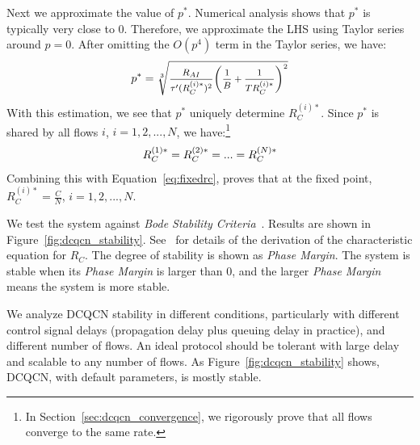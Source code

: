 Next we approximate the value of $p^*$. Numerical analysis shows that $p^*$ is 
typically very close to 0. Therefore, we approximate the LHS using Taylor series around $p=0$.
After omitting the $O(p^4)$ term in the Taylor series, we have:
\begin{equation}
\small
{p^*} = \sqrt[3]{{\frac{{{R_{AI}}}}{{{\tau '}(R_C^{(i)*})^2}}{{\left( {\frac{1}{B} + \frac{1}{TR_C^{(i)*}}} \right)}^2}}}
\label{eq:fixedp}
\end{equation}
With this estimation, we see that $p^*$ uniquely determine $R_C^{(i)*}$. 
Since $p^*$ is shared by all flows $i$, $i = 1, 2, ..., N$, we have:\footnote{In 
Section~\ref{sec:dcqcn_convergence}, we rigorously prove that all flows
converge to the same rate.}
\begin{equation}
\small
R_C^{(1)*} = R_C^{(2)*} = ... = R_C^{(N)*}
\end{equation}
Combining this with Equation~\ref{eq:fixedrc}, proves that at the fixed point, $R_C^{(i)*} = \frac{C}{N}$, 
$i = 1, 2, ..., N$.

We test the system against {\em Bode Stability Criteria}~\cite{controltheory}. 
Results are shown in Figure~\ref{fig:dcqcn_stability}. See~\cite{fullpaper} for
details of the derivation of the characteristic equation for $R_C$.
The degree of stability is shown as {\em
Phase Margin}. The system is stable when its {\em Phase Margin} is larger than
0, and the larger {\em Phase Margin} means the system is more stable.

We analyze DCQCN stability in different conditions, particularly with different
control signal delays (propagation delay plus queuing delay in practice), and
different number of flows. An ideal protocol should be tolerant with large delay
and scalable to any number of flows. As Figure~\ref{fig:dcqcn_stability} shows,
DCQCN, with default parameters, is mostly stable. 

